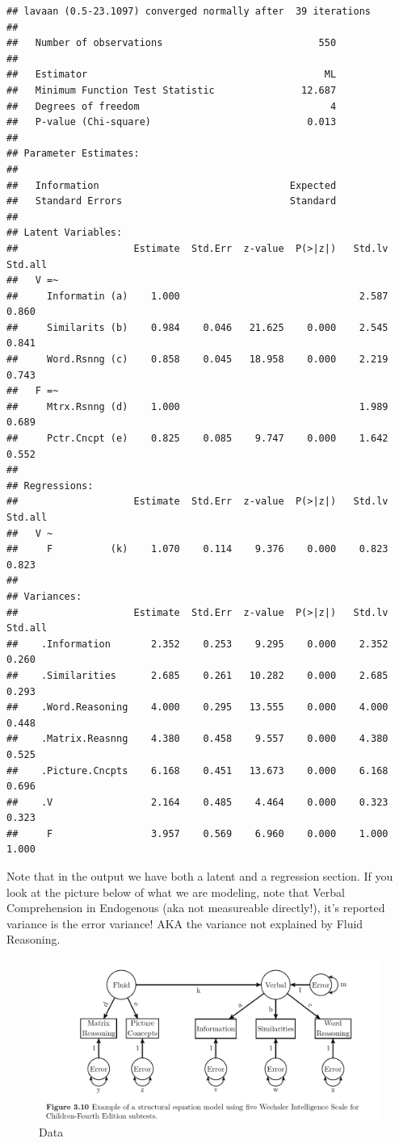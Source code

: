 \documentclass[]{book}
\theoremstyle{definition}
\theoremstyle{definition}
\theoremstyle{definition}
\theoremstyle{remark}
\begin{document}
\begin{verbatim}
## lavaan (0.5-23.1097) converged normally after  39 iterations
## 
##   Number of observations                           550
## 
##   Estimator                                         ML
##   Minimum Function Test Statistic               12.687
##   Degrees of freedom                                 4
##   P-value (Chi-square)                           0.013
## 
## Parameter Estimates:
## 
##   Information                                 Expected
##   Standard Errors                             Standard
## 
## Latent Variables:
##                    Estimate  Std.Err  z-value  P(>|z|)   Std.lv  Std.all
##   V =~                                                                  
##     Informatin (a)    1.000                               2.587    0.860
##     Similarits (b)    0.984    0.046   21.625    0.000    2.545    0.841
##     Word.Rsnng (c)    0.858    0.045   18.958    0.000    2.219    0.743
##   F =~                                                                  
##     Mtrx.Rsnng (d)    1.000                               1.989    0.689
##     Pctr.Cncpt (e)    0.825    0.085    9.747    0.000    1.642    0.552
## 
## Regressions:
##                    Estimate  Std.Err  z-value  P(>|z|)   Std.lv  Std.all
##   V ~                                                                   
##     F          (k)    1.070    0.114    9.376    0.000    0.823    0.823
## 
## Variances:
##                    Estimate  Std.Err  z-value  P(>|z|)   Std.lv  Std.all
##    .Information       2.352    0.253    9.295    0.000    2.352    0.260
##    .Similarities      2.685    0.261   10.282    0.000    2.685    0.293
##    .Word.Reasoning    4.000    0.295   13.555    0.000    4.000    0.448
##    .Matrix.Reasnng    4.380    0.458    9.557    0.000    4.380    0.525
##    .Picture.Cncpts    6.168    0.451   13.673    0.000    6.168    0.696
##    .V                 2.164    0.485    4.464    0.000    0.323    0.323
##     F                 3.957    0.569    6.960    0.000    1.000    1.000
\end{verbatim}

Note that in the output we have both a latent and a regression section.
If you look at the picture below of what we are modeling, note that
Verbal Comprehension in Endogenous (aka not measureable directly!), it's
reported variance is the error variance! AKA the variance not explained
by Fluid Reasoning.

\begin{figure}
\centering
\includegraphics{img/beaupath16.png}
\caption{Data}
\end{figure}
\end{document}
